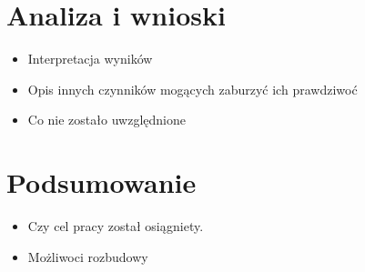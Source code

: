\chapter{Analiza i wnioski }
\label{cha:pierwszyDokument}

\begin{itemize}
\item Interpretacja wyników
\item Opis innych czynników mogących zaburzyć ich prawdziwoć
\item Co nie zostało uwzględnione 
\end{itemize}


\chapter{Podsumowanie}
\label{cha:pierwszyDokument}

\begin{itemize}
\item Czy cel pracy został osiągniety.
\item Możliwoci rozbudowy
\end{itemize}





